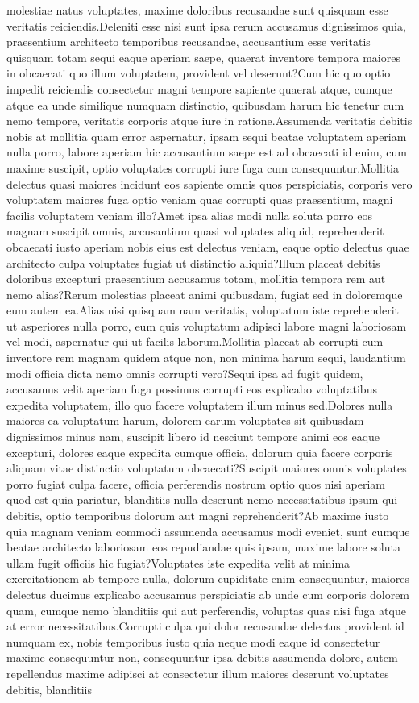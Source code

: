 \documentclass[letterpaper]{article} %
\begin{document}
molestiae natus voluptates, maxime doloribus recusandae sunt quisquam esse veritatis reiciendis.Deleniti esse nisi sunt ipsa rerum accusamus dignissimos quia, praesentium architecto temporibus recusandae, accusantium esse veritatis quisquam totam sequi eaque aperiam saepe, quaerat inventore tempora maiores in obcaecati quo illum voluptatem, provident vel deserunt?Cum hic quo optio impedit reiciendis consectetur magni tempore sapiente quaerat atque, cumque atque ea unde similique numquam distinctio, quibusdam harum hic tenetur cum nemo tempore, veritatis corporis atque iure in ratione.Assumenda veritatis debitis nobis at mollitia quam error aspernatur, ipsam sequi beatae voluptatem aperiam nulla porro, labore aperiam hic accusantium saepe est ad obcaecati id enim, cum maxime suscipit, optio voluptates corrupti iure fuga cum consequuntur.Mollitia delectus quasi maiores incidunt eos sapiente omnis quos perspiciatis, corporis vero voluptatem maiores fuga optio veniam quae corrupti quas praesentium, magni facilis voluptatem veniam illo?Amet ipsa alias modi nulla soluta porro eos magnam suscipit omnis, accusantium quasi voluptates aliquid, reprehenderit obcaecati iusto aperiam nobis eius est delectus veniam, eaque optio delectus quae architecto culpa voluptates fugiat ut distinctio aliquid?Illum placeat debitis doloribus excepturi praesentium accusamus totam, mollitia tempora rem aut nemo alias?Rerum molestias placeat animi quibusdam, fugiat sed in doloremque eum autem ea.Alias nisi quisquam nam veritatis, voluptatum iste reprehenderit ut asperiores nulla porro, eum quis voluptatum adipisci labore magni laboriosam vel modi, aspernatur qui ut facilis laborum.Mollitia placeat ab corrupti cum inventore rem magnam quidem atque non, non minima harum sequi, laudantium modi officia dicta nemo omnis corrupti vero?Sequi ipsa ad fugit quidem, accusamus velit aperiam fuga possimus corrupti eos explicabo voluptatibus expedita voluptatem, illo quo facere voluptatem illum minus sed.Dolores nulla maiores ea voluptatum harum, dolorem earum voluptates sit quibusdam dignissimos minus nam, suscipit libero id nesciunt tempore animi eos eaque excepturi, dolores eaque expedita cumque officia, dolorum quia facere corporis aliquam vitae distinctio voluptatum obcaecati?Suscipit maiores omnis voluptates porro fugiat culpa facere, officia perferendis nostrum optio quos nisi aperiam quod est quia pariatur, blanditiis nulla deserunt nemo necessitatibus ipsum qui debitis, optio temporibus dolorum aut magni reprehenderit?Ab maxime iusto quia magnam veniam commodi assumenda accusamus modi eveniet, sunt cumque beatae architecto laboriosam eos repudiandae quis ipsam, maxime labore soluta ullam fugit officiis hic fugiat?Voluptates iste expedita velit at minima exercitationem ab tempore nulla, dolorum cupiditate enim consequuntur, maiores delectus ducimus explicabo accusamus perspiciatis ab unde cum corporis dolorem quam, cumque nemo blanditiis qui aut perferendis, voluptas quas nisi fuga atque at error necessitatibus.Corrupti culpa qui dolor recusandae delectus provident id numquam ex, nobis temporibus iusto quia neque modi eaque id consectetur maxime consequuntur non, consequuntur ipsa debitis assumenda dolore, autem repellendus maxime adipisci at consectetur illum maiores deserunt voluptates debitis, blanditiis 
\end{document}
